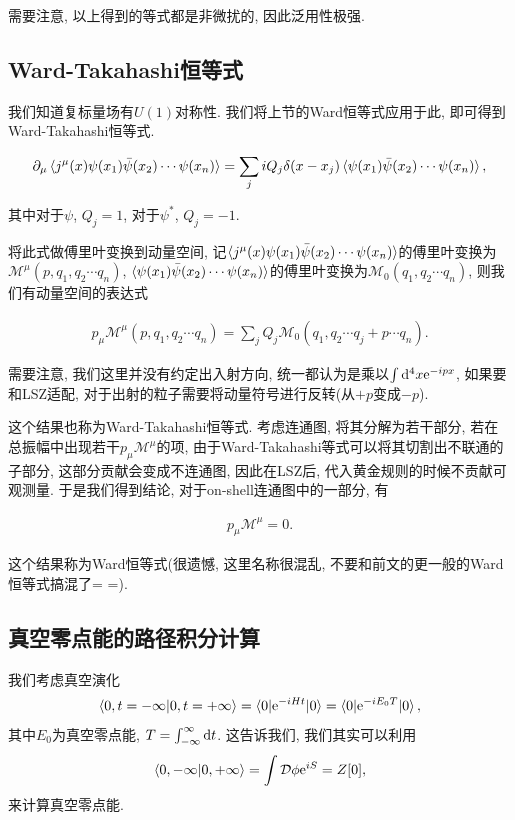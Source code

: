需要注意, 以上得到的等式都是非微扰的, 因此泛用性极强.

\subsection{Ward-Takahashi恒等式}
我们知道复标量场有$U(1)$对称性. 我们将上节的Ward恒等式应用于此, 即可得到Ward-Takahashi恒等式. 
\begin{theorem}
    \begin{align}
        \partial_\mu\braket{j^\mu(x)\psi(x_1)\bar\psi(x_2)\cdots\psi(x_n)}=\sum_j iQ_j\delta(x-x_j)\braket{\psi(x_1)\bar\psi(x_2)\cdots\psi(x_n)},
    \end{align}
\end{theorem}
其中对于$\psi$, $Q_j=1$, 对于$\psi^*$, $Q_j=-1$. 

将此式做傅里叶变换到动量空间, 记$\braket{j^\mu(x)\psi(x_1)\bar\psi(x_2)\cdots\psi(x_n)}$的傅里叶变换为$\mathcal M^\mu(p, q_1,q_2\cdots q_n)$, $\braket{\psi(x_1)\bar\psi(x_2)\cdots\psi(x_n)}$的傅里叶变换为$\mathcal M_0(q_1,q_2\cdots q_n)$, 则我们有动量空间的表达式
\begin{theorem}
    \begin{align}
        p_\mu\mathcal M^\mu(p, q_1,q_2\cdots q_n)=\sum_j Q_j \mathcal M_0(q_1, q_2\cdots q_j+p \cdots q_n).
    \end{align}
\end{theorem}
需要注意, 我们这里并没有约定出入射方向, 统一都认为是乘以$\int\mathrm d^4x\mathrm e^{-ipx}$, 如果要和LSZ适配, 对于出射的粒子需要将动量符号进行反转(从$+p$变成$-p$).

这个结果也称为Ward-Takahashi恒等式. 考虑连通图, 将其分解为若干部分, 若在总振幅中出现若干$p_\mu \mathcal M^\mu$的项, 由于Ward-Takahashi等式可以将其切割出不联通的子部分, 这部分贡献会变成不连通图, 因此在LSZ后, 代入黄金规则的时候不贡献可观测量. 于是我们得到结论, 对于on-shell连通图中的一部分, 有
\begin{theorem}[Ward恒等式]\label{ward-identity-qed}
    \begin{align}
        p_\mu \mathcal M^\mu=0.
    \end{align}
\end{theorem}
这个结果称为Ward恒等式(很遗憾, 这里名称很混乱, 不要和前文的更一般的Ward恒等式搞混了= =).

\subsection{真空零点能的路径积分计算}\label{vac-energy-path-integral}
我们考虑真空演化
\begin{align}
    \braket{0, t=-\infty|0, t=+\infty}=\braket{0|\mathrm e^{-iHt}|0}=\braket{0|\mathrm e^{-iE_0T}|0},
\end{align}
其中$E_0$为真空零点能, $T=\int_{-\infty}^{\infty}\mathrm d t$. 这告诉我们, 我们其实可以利用
\begin{align}
    \braket{0, -\infty|0, +\infty}=\int\mathcal D\phi\mathrm e^{iS}=Z[0],
\end{align}
来计算真空零点能.

